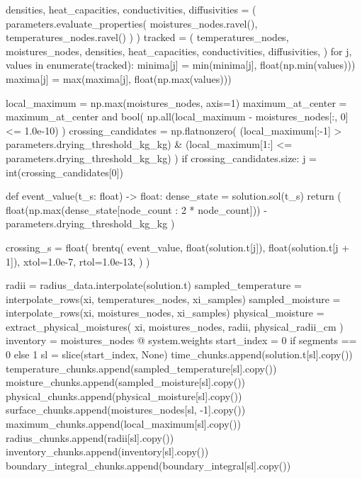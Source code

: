 \documentclass[withoutpreface,bwprint]{cumcmthesis}
\begin{document}
\begin{PythonCode}
        densities, heat_capacities, conductivities, diffusivities = (
            parameters.evaluate_properties(
                moistures_nodes.ravel(), temperatures_nodes.ravel()
            )
        )
        tracked = (
            temperatures_nodes,
            moistures_nodes,
            densities,
            heat_capacities,
            conductivities,
            diffusivities,
        )
        for j, values in enumerate(tracked):
            minima[j] = min(minima[j], float(np.min(values)))
            maxima[j] = max(maxima[j], float(np.max(values)))

        local_maximum = np.max(moistures_nodes, axis=1)
        maximum_at_center = maximum_at_center and bool(
            np.all(local_maximum - moistures_nodes[:, 0] <= 1.0e-10)
        )
        crossing_candidates = np.flatnonzero(
            (local_maximum[:-1] > parameters.drying_threshold_kg_kg)
            & (local_maximum[1:] <= parameters.drying_threshold_kg_kg)
        )
        if crossing_candidates.size:
            j = int(crossing_candidates[0])

            def event_value(t_s: float) -> float:
                dense_state = solution.sol(t_s)
                return (
                    float(np.max(dense_state[node_count : 2 * node_count]))
                    - parameters.drying_threshold_kg_kg
                )

            crossing_s = float(
                brentq(
                    event_value,
                    float(solution.t[j]),
                    float(solution.t[j + 1]),
                    xtol=1.0e-7,
                    rtol=1.0e-13,
                )
            )

        radii = radius_data.interpolate(solution.t)
        sampled_temperature = interpolate_rows(xi, temperatures_nodes, xi_samples)
        sampled_moisture = interpolate_rows(xi, moistures_nodes, xi_samples)
        physical_moisture = extract_physical_moistures(
            xi, moistures_nodes, radii, physical_radii_cm
        )
        inventory = moistures_nodes @ system.weights
        start_index = 0 if segments == 0 else 1
        sl = slice(start_index, None)
        time_chunks.append(solution.t[sl].copy())
        temperature_chunks.append(sampled_temperature[sl].copy())
        moisture_chunks.append(sampled_moisture[sl].copy())
        physical_chunks.append(physical_moisture[sl].copy())
        surface_chunks.append(moistures_nodes[sl, -1].copy())
        maximum_chunks.append(local_maximum[sl].copy())
        radius_chunks.append(radii[sl].copy())
        inventory_chunks.append(inventory[sl].copy())
        boundary_integral_chunks.append(boundary_integral[sl].copy())


\end{PythonCode}
\end{document}
